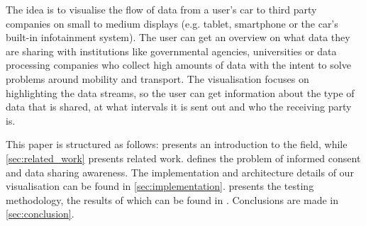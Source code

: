 \documentclass[../paper.tex]{subfiles}
\begin{document}

  The idea is to visualise the flow of data from a user’s car to third party
  companies on small to medium displays (e.g. tablet, smartphone or the car’s
  built-in infotainment system). The user can get an overview on what data they
  are sharing with institutions like governmental agencies, universities or
  data processing companies who collect high amounts of data with the intent to
  solve problems around mobility and transport. The visualisation
  focuses on highlighting the data streams, so the user can get
  information about the type of data that is shared, at what intervals it is
  sent out and who the receiving party is.

  This paper is structured as follows:  presents an
  introduction to the field, while \cref{sec:related_work} presents related
  work.  defines the problem of informed consent and data sharing awareness. 
  The implementation and architecture details of our visualisation can be found in \cref{sec:implementation}.  presents the
  testing methodology, the results of which can be found in .
  Conclusions are made in \cref{sec:conclusion}.
\end{document}
